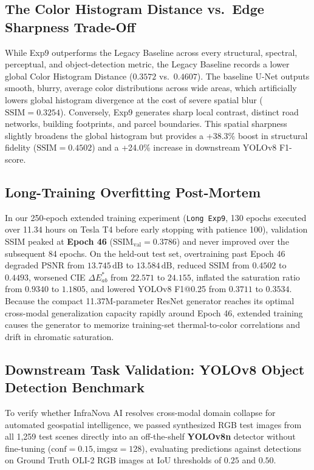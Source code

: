 \documentclass[10pt,a4paper,twoside]{article}
\begin{document}
\subsection{The Color Histogram Distance vs.~Edge Sharpness Trade-Off}
While Exp9 outperforms the Legacy Baseline across every structural, spectral, perceptual, and object-detection metric, the Legacy Baseline records a lower global Color Histogram Distance ($0.3572$ vs.~$0.4607$). The baseline U-Net outputs smooth, blurry, average color distributions across wide areas, which artificially lowers global histogram divergence at the cost of severe spatial blur ($\text{SSIM} = 0.3254$). Conversely, Exp9 generates sharp local contrast, distinct road networks, building footprints, and parcel boundaries. This spatial sharpness slightly broadens the global histogram but provides a +38.3\% boost in structural fidelity ($\text{SSIM} = 0.4502$) and a +24.0\% increase in downstream YOLOv8 F1-score.

\subsection{Long-Training Overfitting Post-Mortem}
In our 250-epoch extended training experiment (\texttt{Long Exp9}, 130 epochs executed over 11.34 hours on Tesla T4 before early stopping with patience 100), validation SSIM peaked at \textbf{Epoch 46} ($\text{SSIM}_{\mathrm{val}} = 0.3786$) and never improved over the subsequent 84 epochs. On the held-out test set, overtraining past Epoch 46 degraded PSNR from $13.745\,\text{dB}$ to $13.584\,\text{dB}$, reduced SSIM from $0.4502$ to $0.4493$, worsened CIE $\Delta E^*_{ab}$ from $22.571$ to $24.155$, inflated the saturation ratio from $0.9340$ to $1.1805$, and lowered YOLOv8 F1@0.25 from $0.3711$ to $0.3534$. Because the compact 11.37M-parameter ResNet generator reaches its optimal cross-modal generalization capacity rapidly around Epoch 46, extended training causes the generator to memorize training-set thermal-to-color correlations and drift in chromatic saturation.

\subsection{Downstream Task Validation: YOLOv8 Object Detection Benchmark}
To verify whether InfraNova AI resolves cross-modal domain collapse for automated geospatial intelligence, we passed synthesized RGB test images from all 1,259 test scenes directly into an off-the-shelf \textbf{YOLOv8n} detector \cite{ref4} without fine-tuning ($\text{conf} = 0.15, \text{imgsz} = 128$), evaluating predictions against detections on Ground Truth OLI-2 RGB images at IoU thresholds of $0.25$ and $0.50$.
\end{document}
